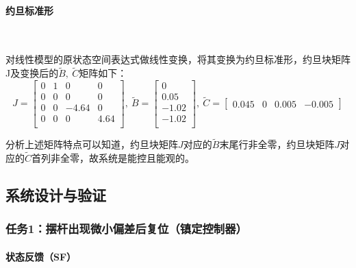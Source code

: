 \documentclass[UTF8]{article}
\begin{document}
\paragraph{约旦标准形}~{}

对线性模型的原状态空间表达式做线性变换，将其变换为约旦标准形，约旦块矩阵J及变换后的$\tilde{B},\ \tilde{C}$矩阵如下：
\begin{equation*}
	J = \begin{bmatrix}
		0 & 1 & 0 & 0 \\
		0 & 0 & 0 & 0 \\
		0 & 0 & -4.64 & 0 \\
		0 & 0 & 0 & 4.64 \\
	\end{bmatrix},\ 
	\tilde{B} = \begin{bmatrix}
		0 \\
		0.05 \\
		-1.02 \\
		-1.02 \\
	\end{bmatrix},\ 
	\tilde{C} = \begin{bmatrix}
		0.045 & 0 & 0.005 & -0.005
	\end{bmatrix}
\end{equation*}

分析上述矩阵特点可以知道，约旦块矩阵$J$对应的$\tilde{B}$末尾行非全零，约旦块矩阵$J$对应的$\tilde{C}$首列非全零，故系统是能控且能观的。


\subsection{系统设计与验证}



\subsubsection{任务1：摆杆出现微小偏差后复位（镇定控制器）}
\paragraph{状态反馈（SF）}~{}
\end{document}
